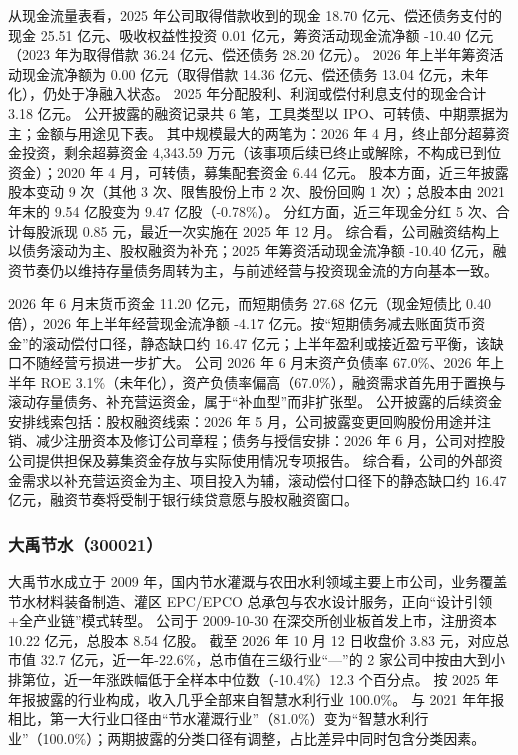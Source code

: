  从现金流量表看，2025 年公司取得借款收到的现金 18.70 亿元、偿还债务支付的现金 25.51 亿元、吸收权益性投资 0.01 亿元，筹资活动现金流净额 -10.40 亿元（2023 年为取得借款 36.24 亿元、偿还债务 28.20 亿元）。 2026 年上半年筹资活动现金流净额为 0.00 亿元（取得借款 14.36 亿元、偿还债务 13.04 亿元，未年化），仍处于净融入状态。 2025 年分配股利、利润或偿付利息支付的现金合计 3.18 亿元。 公开披露的融资记录共 6 笔，工具类型以 IPO、可转债、中期票据为主；金额与用途见下表。 其中规模最大的两笔为：2026 年 4 月，终止部分超募资金投资，剩余超募资金 4,343.59 万元（该事项后续已终止或解除，不构成已到位资金）；2020 年 4 月，可转债，募集配套资金 6.44 亿元。 股本方面，近三年披露股本变动 9 次（其他 3 次、限售股份上市 2 次、股份回购 1 次）；总股本由 2021 年末的 9.54 亿股变为 9.47 亿股（-0.78\%）。 分红方面，近三年现金分红 5 次、合计每股派现 0.85 元，最近一次实施在 2025 年 12 月。 综合看，公司融资结构上以债务滚动为主、股权融资为补充；2025 年筹资活动现金流净额 -10.40 亿元，融资节奏仍以维持存量债务周转为主，与前述经营与投资现金流的方向基本一致。

 2026 年 6 月末货币资金 11.20 亿元，而短期债务 27.68 亿元（现金短债比 0.40 倍），2026 年上半年经营现金流净额 -4.17 亿元。按“短期债务减去账面货币资金”的滚动偿付口径，静态缺口约 16.47 亿元；上半年盈利或接近盈亏平衡，该缺口不随经营亏损进一步扩大。 公司 2026 年 6 月末资产负债率 67.0\%、2026 年上半年 ROE 3.1\%（未年化），资产负债率偏高（67.0\%），融资需求首先用于置换与滚动存量债务、补充营运资金，属于“补血型”而非扩张型。 公开披露的后续资金安排线索包括：股权融资线索：2026 年 5 月，公司披露变更回购股份用途并注销、减少注册资本及修订公司章程；债务与授信安排：2026 年 6 月，公司对控股公司提供担保及募集资金存放与实际使用情况专项报告。 综合看，公司的外部资金需求以补充营运资金为主、项目投入为辅，滚动偿付口径下的静态缺口约 16.47 亿元，融资节奏将受制于银行续贷意愿与股权融资窗口。




\subsubsection{大禹节水（300021）}
\label{co:300021}

 大禹节水成立于 2009 年，国内节水灌溉与农田水利领域主要上市公司，业务覆盖节水材料装备制造、灌区 EPC/EPCO 总承包与农水设计服务，正向“设计引领+全产业链”模式转型。 公司于 2009-10-30 在深交所创业板首发上市，注册资本 10.22 亿元，总股本 8.54 亿股。 截至 2026 年 10 月 12 日收盘价 3.83 元，对应总市值 32.7 亿元，近一年-22.6\%，总市值在三级行业“—”的 2 家公司中按由大到小排第位，近一年涨跌幅低于全样本中位数（-10.4\%）12.3 个百分点。 按 2025 年年报披露的行业构成，收入几乎全部来自智慧水利行业 100.0\%。 与 2021 年年报相比，第一大行业口径由“节水灌溉行业”（81.0\%）变为“智慧水利行业”（100.0\%）；两期披露的分类口径有调整，占比差异中同时包含分类因素。

